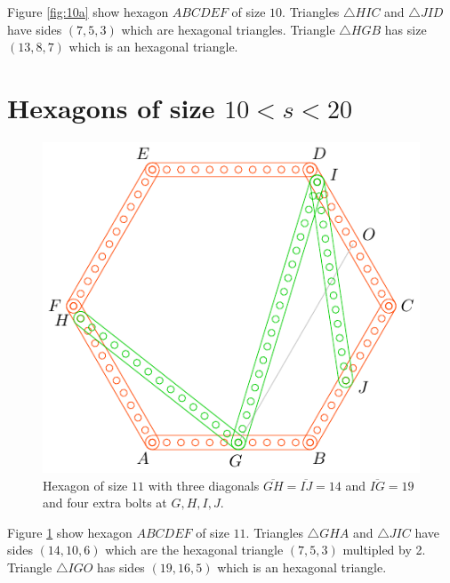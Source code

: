 \documentclass[11pt]{article}
\begin{document}
Figure \ref{fig:10a} show hexagon $ABCDEF$ of size $10$. Triangles $\triangle{HIC}$ and $\triangle{JID}$ have sides $(7,5,3)$ which are hexagonal triangles. Triangle $\triangle{HGB}$ has size $(13,8,7)$ which is an hexagonal triangle.

\section{Hexagons of size $10 < s < 20$ }

\begin{figure}[H]
\centering
\includegraphics[scale=1]{11/hexa-11a}
\caption{Hexagon of size $11$ with three diagonals $\overline{GH} = \overline{IJ} = 14$ and $\overline{IG} = 19$ and four extra bolts at $G,H,I,J$.}
\label{fig:11a}
\end{figure}

Figure \ref{fig:11a} show hexagon $ABCDEF$ of size $11$. Triangles $\triangle{GHA}$ and $\triangle{JIC}$ have sides $(14,10,6)$ which are the hexagonal triangle $(7,5,3)$ multipled by 2. Triangle $\triangle{IGO}$ has sides $(19,16,5)$ which is an hexagonal triangle.
\end{document}
